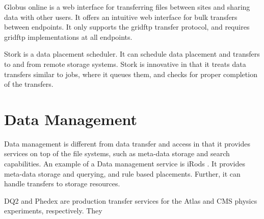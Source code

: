 Globus online \cite{foster2011globus} is a web interface for transferring files between sites and sharing data with other users.  It offers an intuitive web interface for bulk transfers between endpoints.  It only supports the gridftp \cite{allcock2005globus} transfer protocol, and requires gridftp implementations at all endpoints.

Stork \cite{kosar2004stork} is a data placement scheduler.  It can schedule data placement and transfers to and from remote storage systems.  Stork is innovative in that it treats data transfers similar to jobs, where it queues them, and checks for proper completion of the transfers.

\section{Data Management}

Data management is different from data transfer and access in that it provides services on top of the file systems, such as meta-data storage and search capabilities.  An example of a Data management service is iRods \cite{rajasekar2010irods}.  It provides meta-data storage and querying, and rule based placements.  Further, it can handle transfers to storage resources.

DQ2 \cite{branco2008managing} and Phedex \cite{rehn2006phedex} are production transfer services for the Atlas and CMS physics experiments, respectively.  They 



